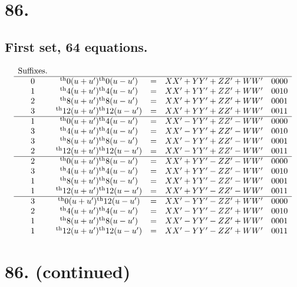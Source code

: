 \documentclass[11pt,a4paper]{book}
\providecommand{\uth}{\textsuperscript{th}}
\begin{document}
\newpage
\section*{86.}
\label{sec:86}

\subsection*{First set, 64 equations.}

\[
\begin{array}{ccccc}
\text{Suffixes.} & & & & \\
\hline
0 & \uth{0}(u+u')\uth{0}(u-u') &=& XX' + YY' + ZZ' + WW' & 0000 \\
1 & \uth{4}(u+u')\uth{4}(u-u') &=& XX' + YY' + ZZ' + WW' & 0010 \\
2 & \uth{8}(u+u')\uth{8}(u-u') &=& XX' + YY' + ZZ' + WW' & 0001 \\
3 & \uth{12}(u+u')\uth{12}(u-u') &=& XX' + YY' + ZZ' + WW' & 0011 \\
\hline
1 & \uth{0}(u+u')\uth{4}(u-u') &=& XX' - YY' + ZZ' - WW' & 0000 \\
3 & \uth{4}(u+u')\uth{4}(u-u') &=& XX' - YY' + ZZ' - WW' & 0010 \\
3 & \uth{8}(u+u')\uth{8}(u-u') &=& XX' - YY' + ZZ' - WW' & 0001 \\
2 & \uth{12}(u+u')\uth{12}(u-u') &=& XX' - YY' + ZZ' - WW' & 0011 \\
\hline
2 & \uth{0}(u+u')\uth{8}(u-u') &=& XX' + YY' - ZZ' - WW' & 0000 \\
3 & \uth{4}(u+u')\uth{4}(u-u') &=& XX' + YY' - ZZ' - WW' & 0010 \\
1 & \uth{8}(u+u')\uth{8}(u-u') &=& XX' + YY' - ZZ' - WW' & 0001 \\
1 & \uth{12}(u+u')\uth{12}(u-u') &=& XX' + YY' - ZZ' - WW' & 0011 \\
\hline
3 & \uth{0}(u+u')\uth{12}(u-u') &=& XX' - YY' - ZZ' + WW' & 0000 \\
2 & \uth{4}(u+u')\uth{4}(u-u') &=& XX' - YY' - ZZ' + WW' & 0010 \\
1 & \uth{8}(u+u')\uth{8}(u-u') &=& XX' - YY' - ZZ' + WW' & 0001 \\
1 & \uth{12}(u+u')\uth{12}(u-u') &=& XX' - YY' - ZZ' + WW' & 0011
\end{array}
\]


\newpage
\section*{86. (continued)}
\label{sec:86cont}
\end{document}
